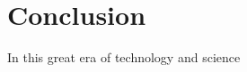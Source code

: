 \section{Conclusion}
In this great era of technology and science




\renewcommand\bibname{References} %



